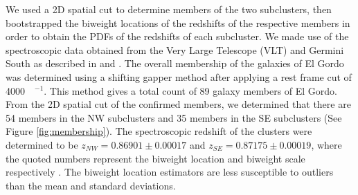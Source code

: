 

We used a 2D spatial cut to determine members of the two
subclusters, then bootstrapped the biweight locations of the redshifts of the
respective members in order to obtain the PDFs of the redshifts of each
subcluster. We made use of the spectroscopic data
obtained from the Very Large Telescope (VLT) and Germini South as described
in  and \citet{Sifon13}. The overall membership of the galaxies
of El Gordo was determined using a shifting gapper method after applying a
rest frame cut of 4000~\kilo\meter~\second$^{-1}$. This method gives a
total count of 89 galaxy members of El Gordo. From the 2D spatial cut of
the confirmed members, we determined that there are 54 members in the NW
subclusters and 35 members in the SE subclusters (See Figure
\ref{fig:membership}). The spectroscopic redshift of the clusters were
determined to be $z_{NW} = 0.86901 \pm 0.00017$ and $z_{SE} = 0.87175 \pm
0.00019$, where the quoted numbers represent the biweight location and
biweight scale respectively \citep{Beers90}. The biweight location
estimators are less susceptible to outliers than the mean and standard
deviations. 

%
